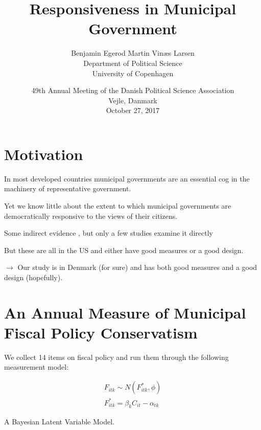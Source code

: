 \documentclass[10pt,aspectratio=169]{beamer}
\title[Municipal Responsiveness]{Responsiveness in Municipal Government}
\author[Egerod \& Larsen]{Benjamin Egerod \qquad Martin Vin\ae s Larsen  \\Department of Political Science \\ University of Copenhagen }
\date[October 27, 2017]{49th Annual Meeting of the Danish Political Science Association \\ Vejle, Danmark \\ October 27, 2017}
\begin{document}
	
\begin{frame}
\titlepage
\end{frame}

\begin{frame}
\end{frame}

\section{Motivation}

\begin{frame}

In most developed countries municipal governments are an essential cog in the machinery of representative government.

\vspace{0.2in} \pause

Yet we know little about the extent to which municipal governments are democratically responsive to the views of their citizens.

\vspace{0.2in} \pause

Some indirect evidence \citep{blom2006parties,folke2014shades,burnett2017politics}, but only a few studies examine it directly \citep{tausanovitch2014representation,einstein2016pushing,sances2017voters}


\vspace{0.2in} \pause

But these are all in the US and either have good measures or a good design.

$\rightarrow$ Our study is in Denmark (for sure) and has both good measures and a good design (hopefully).
\end{frame}

\section[Measure of Municipal Fiscal Policy Conservatism]{An Annual Measure of Municipal Fiscal Policy Conservatism}

\begin{frame}

We collect 14 items on fiscal policy and run them through the following measurement model:


\vspace{0.2in}

\begin{gather*}
F_{itk} \sim N(F^*_{itk}, \phi)\\
F^*_{itk} = \beta_k C_{it} - \alpha_{tk}
\end{gather*}

\vspace{0.2in}

A Bayesian Latent Variable Model.

\end{frame}
\end{document}
